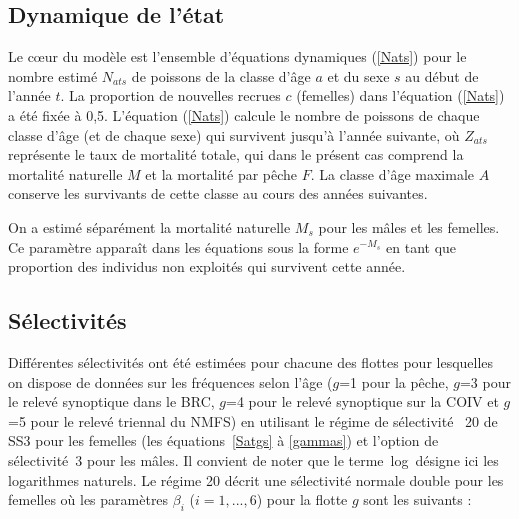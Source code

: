 \documentclass[11pt]{book}
\newcommand{\angL}{\guillemotleft\,}
\newcommand{\angR}{\,\guillemotright}
\newcommand{\eref}[1]{(\ref{#1})}
\begin{document}
\subsection{Dynamique de l'\'{e}tat}

Le c{\oe}ur du mod\`{e}le est l'ensemble d'\'{e}quations dynamiques \eref{Nats} pour le nombre estim\'{e} $N_{ats}$ de poissons de la classe d'\^{a}ge $a$ et du sexe $s$ au d\'{e}but de l'ann\'{e}e $t$. 
La proportion de nouvelles recrues $c$ (femelles) dans l'\'{e}quation \eref{Nats} a \'{e}t\'{e} fix\'{e}e \`{a} 0,5.
L'\'{e}quation \eref{Nats} calcule le nombre de poissons de chaque classe d'\^{a}ge (et de chaque sexe) qui survivent jusqu'\`{a} l'ann\'{e}e suivante, o\`{u} $Z_{ats}$ repr\'{e}sente le taux de mortalit\'{e} totale, qui dans le pr\'{e}sent cas comprend la mortalit\'{e} naturelle $M$ et la mortalit\'{e} par p\^{e}che $F$. 
La classe d'\^{a}ge maximale $A$ conserve les survivants de cette classe au cours des ann\'{e}es suivantes.

On a estim\'{e} s\'{e}par\'{e}ment la mortalit\'{e} naturelle $M_s$ pour les m\^{a}les et les femelles. Ce param\`{e}tre appara\^{i}t dans les \'{e}quations sous la forme $e^{-M_s}$ en tant que proportion des individus non exploit\'{e}s qui survivent cette ann\'{e}e.

\subsection{S\'{e}lectivit\'{e}s} \label{ss:select}

Diff\'{e}rentes s\'{e}lectivit\'{e}s ont \'{e}t\'{e} estim\'{e}es pour chacune des flottes pour lesquelles on dispose de donn\'{e}es sur les fr\'{e}quences selon l'\^{a}ge ($g$=1 pour la p\^{e}che, $g$=3 pour le relev\'{e} synoptique dans le BRC, $g$=4 pour le relev\'{e} synoptique sur la COIV et $g$=5 pour le relev\'{e} triennal du NMFS) en utilisant le r\'{e}gime de s\'{e}lectivit\'{e} ~20 de SS3 pour les femelles (les \'{e}quations~\ref{Satgs} \`{a} \ref{gammas}) et l'option de s\'{e}lectivit\'{e}~3 pour les m\^{a}les.
Il convient de noter que le terme \angL{}log\angR{} d\'{e}signe ici les logarithmes naturels. %
Le r\'{e}gime 20 d\'{e}crit une s\'{e}lectivit\'{e} normale double pour les femelles o\`{u} les param\`{e}tres $\beta_i$ ($i=1,...,6$) pour la flotte $g$ sont les suivants :
\end{document}
